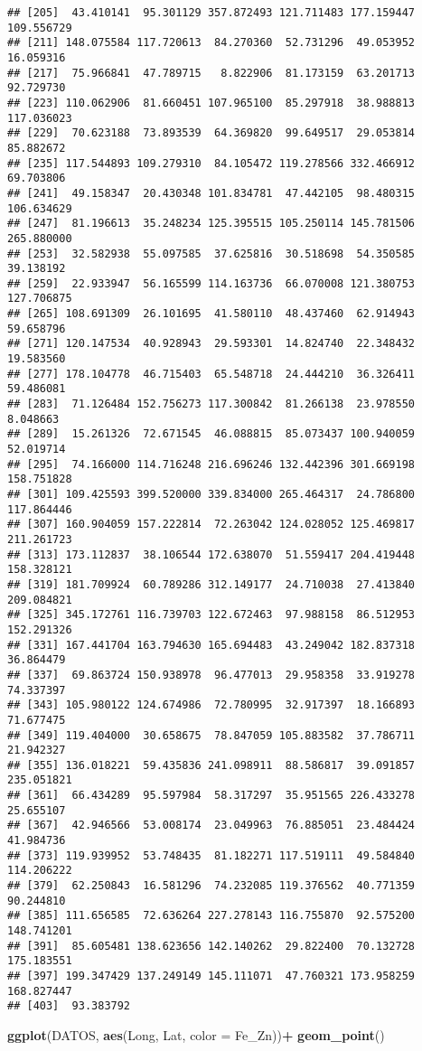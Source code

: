 \documentclass[
]{article}
\newenvironment{Shaded}{\begin{snugshade}}{\end{snugshade}}
\newcommand{\DataTypeTok}[1]{\textcolor[rgb]{0.13,0.29,0.53}{#1}}
\newcommand{\KeywordTok}[1]{\textcolor[rgb]{0.13,0.29,0.53}{\textbf{#1}}}
\newcommand{\NormalTok}[1]{#1}
\newcommand{\OperatorTok}[1]{\textcolor[rgb]{0.81,0.36,0.00}{\textbf{#1}}}
\newcommand{\StringTok}[1]{\textcolor[rgb]{0.31,0.60,0.02}{#1}}
\begin{document}
\begin{verbatim}
## [205]  43.410141  95.301129 357.872493 121.711483 177.159447 109.556729
## [211] 148.075584 117.720613  84.270360  52.731296  49.053952  16.059316
## [217]  75.966841  47.789715   8.822906  81.173159  63.201713  92.729730
## [223] 110.062906  81.660451 107.965100  85.297918  38.988813 117.036023
## [229]  70.623188  73.893539  64.369820  99.649517  29.053814  85.882672
## [235] 117.544893 109.279310  84.105472 119.278566 332.466912  69.703806
## [241]  49.158347  20.430348 101.834781  47.442105  98.480315 106.634629
## [247]  81.196613  35.248234 125.395515 105.250114 145.781506 265.880000
## [253]  32.582938  55.097585  37.625816  30.518698  54.350585  39.138192
## [259]  22.933947  56.165599 114.163736  66.070008 121.380753 127.706875
## [265] 108.691309  26.101695  41.580110  48.437460  62.914943  59.658796
## [271] 120.147534  40.928943  29.593301  14.824740  22.348432  19.583560
## [277] 178.104778  46.715403  65.548718  24.444210  36.326411  59.486081
## [283]  71.126484 152.756273 117.300842  81.266138  23.978550   8.048663
## [289]  15.261326  72.671545  46.088815  85.073437 100.940059  52.019714
## [295]  74.166000 114.716248 216.696246 132.442396 301.669198 158.751828
## [301] 109.425593 399.520000 339.834000 265.464317  24.786800 117.864446
## [307] 160.904059 157.222814  72.263042 124.028052 125.469817 211.261723
## [313] 173.112837  38.106544 172.638070  51.559417 204.419448 158.328121
## [319] 181.709924  60.789286 312.149177  24.710038  27.413840 209.084821
## [325] 345.172761 116.739703 122.672463  97.988158  86.512953 152.291326
## [331] 167.441704 163.794630 165.694483  43.249042 182.837318  36.864479
## [337]  69.863724 150.938978  96.477013  29.958358  33.919278  74.337397
## [343] 105.980122 124.674986  72.780995  32.917397  18.166893  71.677475
## [349] 119.404000  30.658675  78.847059 105.883582  37.786711  21.942327
## [355] 136.018221  59.435836 241.098911  88.586817  39.091857 235.051821
## [361]  66.434289  95.597984  58.317297  35.951565 226.433278  25.655107
## [367]  42.946566  53.008174  23.049963  76.885051  23.484424  41.984736
## [373] 119.939952  53.748435  81.182271 117.519111  49.584840 114.206222
## [379]  62.250843  16.581296  74.232085 119.376562  40.771359  90.244810
## [385] 111.656585  72.636264 227.278143 116.755870  92.575200 148.741201
## [391]  85.605481 138.623656 142.140262  29.822400  70.132728 175.183551
## [397] 199.347429 137.249149 145.111071  47.760321 173.958259 168.827447
## [403]  93.383792
\end{verbatim}

\begin{Shaded}
\begin{Highlighting}[]
\KeywordTok{ggplot}\NormalTok{(DATOS, }\KeywordTok{aes}\NormalTok{(Long, Lat, }\DataTypeTok{color =}\NormalTok{ Fe_Zn))}\OperatorTok{+}
\StringTok{  }\KeywordTok{geom_point}\NormalTok{()}
\end{Highlighting}
\end{Shaded}
\end{document}
